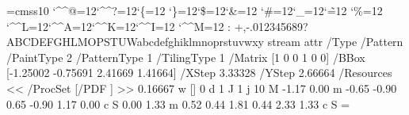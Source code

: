 \font\THFa=cmss10
\begingroup
\catcode`\^^@=12\catcode`\^^?=12\catcode`\{=12
\catcode`\}=12\catcode`\$=12\catcode`\&=12
\catcode`\#=12\catcode`\_=12\catcode`\~=12
\catcode`\%=12
\catcode`\^^L=12\catcode`\^^A=12\catcode`\^^K=12\catcode`\^^I=12
\catcode`\^^M=12
\THFa:^^M+,-.012345689?ABCDEFGHLMOPSTUWabcdefghiklmnoprstuvwxy\endinclude\endgroup
\immediate\pdfobj stream attr {/Type /Pattern
/PaintType 2 /PatternType 1 /TilingType 1
/Matrix [1 0 0 1 0 0]
/BBox [-1.25002 -0.75691 2.41669 1.41664]
/XStep 3.33328
/YStep 2.66664
/Resources << /ProcSet [/PDF ] >> } {
0.16667 w
[] 0 d
1 J
1 j
10 M
-1.17 0.00 m
-0.65 -0.90 0.65 -0.90 1.17 0.00 c
S
0.00 1.33 m
0.52 0.44 1.81 0.44 2.33 1.33 c
S
} \newcount \THPa\THPa=\pdflastobj
